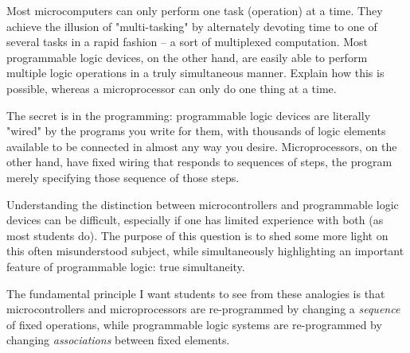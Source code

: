 

Most microcomputers can only perform one task (operation) at a time.  They achieve the illusion of "multi-tasking" by alternately devoting time to one of several tasks in a rapid fashion -- a sort of multiplexed computation.  Most programmable logic devices, on the other hand, are easily able to perform multiple logic operations in a truly simultaneous manner.  Explain how this is possible, whereas a microprocessor can only do one thing at a time.







The secret is in the programming: programmable logic devices are literally "wired" by the programs you write for them, with thousands of logic elements available to be connected in almost any way you desire.  Microprocessors, on the other hand, have fixed wiring that responds to sequences of steps, the program merely specifying those sequence of those steps.







Understanding the distinction between microcontrollers and programmable logic devices can be difficult, especially if one has limited experience with both (as most students do).  The purpose of this question is to shed some more light on this often misunderstood subject, while simultaneously highlighting an important feature of programmable logic: true simultaneity.

The fundamental principle I want students to see from these analogies is that microcontrollers and microprocessors are re-programmed by changing a {\it sequence} of fixed operations, while programmable logic systems are re-programmed by changing {\it associations} between fixed elements.




